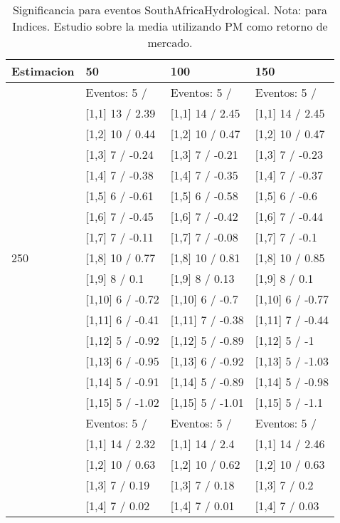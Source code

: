 \begin{table}

\caption{Significancia para eventos SouthAfricaHydrological. Nota: para Indices. Estudio sobre la media utilizando PM como retorno de mercado.}
\centering
\begin{tabular}[t]{llll}
\toprule
Estimacion & 50 & 100 & 150\\
\midrule
 & Eventos:  5 / & Eventos:  5 / & Eventos:  5 /\\
 & {}[1,1] 13  / 2.39 & {}[1,1] 14  / 2.45 & {}[1,1] 14  / 2.45\\
 & {}[1,2] 10  / 0.44 & {}[1,2] 10  / 0.47 & {}[1,2] 10  / 0.47\\
 & {}[1,3] 7  / -0.24 & {}[1,3] 7  / -0.21 & {}[1,3] 7  / -0.23\\
 & {}[1,4] 7  / -0.38 & {}[1,4] 7  / -0.35 & {}[1,4] 7  / -0.37\\
\addlinespace
 & {}[1,5] 6  / -0.61 & {}[1,5] 6  / -0.58 & {}[1,5] 6  / -0.6\\
 & {}[1,6] 7  / -0.45 & {}[1,6] 7  / -0.42 & {}[1,6] 7  / -0.44\\
 & {}[1,7] 7  / -0.11 & {}[1,7] 7  / -0.08 & {}[1,7] 7  / -0.1\\
250 & {}[1,8] 10  / 0.77 & {}[1,8] 10  / 0.81 & {}[1,8] 10  / 0.85\\
 & {}[1,9] 8  / 0.1 & {}[1,9] 8  / 0.13 & {}[1,9] 8  / 0.1\\
\addlinespace
 & {}[1,10] 6  / -0.72 & {}[1,10] 6  / -0.7 & {}[1,10] 6  / -0.77\\
 & {}[1,11] 6  / -0.41 & {}[1,11] 7  / -0.38 & {}[1,11] 7  / -0.44\\
 & {}[1,12] 5  / -0.92 & {}[1,12] 5  / -0.89 & {}[1,12] 5  / -1\\
 & {}[1,13] 6  / -0.95 & {}[1,13] 6  / -0.92 & {}[1,13] 5  / -1.03\\
 & {}[1,14] 5  / -0.91 & {}[1,14] 5  / -0.89 & {}[1,14] 5  / -0.98\\
\addlinespace
 & {}[1,15] 5  / -1.02 & {}[1,15] 5  / -1.01 & {}[1,15] 5  / -1.1\\
 & Eventos:  5 / & Eventos:  5 / & Eventos:  5 /\\
 & {}[1,1] 14  / 2.32 & {}[1,1] 14  / 2.4 & {}[1,1] 14  / 2.46\\
 & {}[1,2] 10  / 0.63 & {}[1,2] 10  / 0.62 & {}[1,2] 10  / 0.63\\
 & {}[1,3] 7  / 0.19 & {}[1,3] 7  / 0.18 & {}[1,3] 7  / 0.2\\
\addlinespace
 & {}[1,4] 7  / 0.02 & {}[1,4] 7  / 0.01 & {}[1,4] 7  / 0.03\\

\end{tabular}
\end{table}

